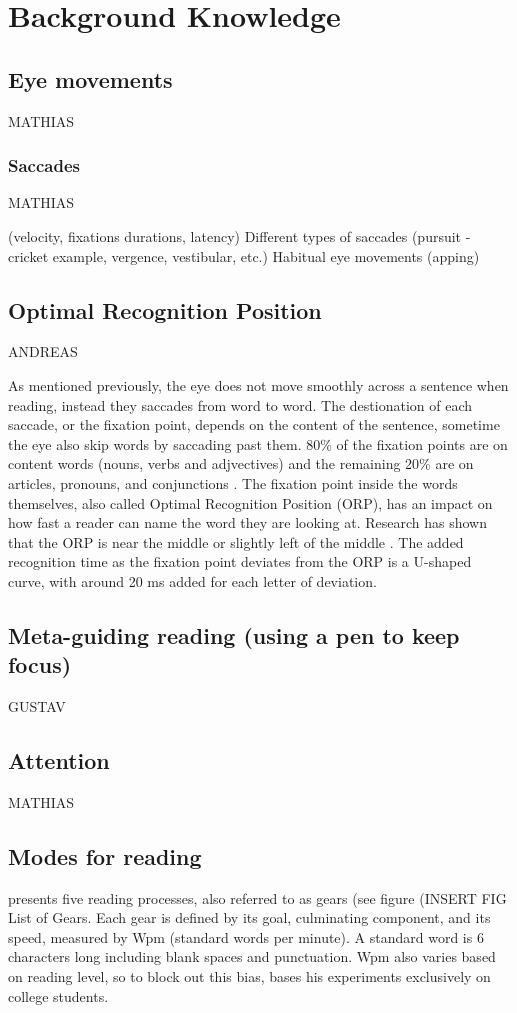 \section{Background Knowledge}

\subsection{Eye movements}
MATHIAS

\subsubsection{Saccades}
MATHIAS

(velocity, fixations durations, latency)
Different types of saccades (pursuit - cricket example, vergence, vestibular, etc.)
Habitual eye movements (apping)
\subsection{Optimal Recognition Position} \label{ORP}
ANDREAS

As mentioned previously, the eye does not move smoothly across a sentence when reading, instead they saccades from word to word. The destionation of each saccade, or the fixation point, depends on the content of the sentence, sometime the eye also skip words by saccading past them. 80\% of the fixation points are on content words (nouns, verbs and adjvectives) and the remaining 20\% are on articles, pronouns, and conjunctions \cite{eysenck_cognitive_2010}. The fixation point inside the words themselves, also called Optimal Recognition Position (ORP), has an impact on how fast a reader can name the word they are looking at. Research has shown that the ORP is near the middle or slightly left of the middle \cite{oregan_optimal_1992, nazir_letter_1998, oregan_convenient_1984}. The added recognition time as the fixation point deviates from the ORP is a U-shaped curve, with around 20 ms added for each letter of deviation.


\subsection{Meta-guiding reading (using a pen to keep focus)}
GUSTAV

\subsection{Attention}
MATHIAS

\subsection{Modes for reading}
\cite{carver_reading_1992} presents five reading processes, also referred to as gears (see figure (INSERT FIG List of Gears. Each gear is defined by its goal, culminating component, and its speed, measured by Wpm (standard words per minute). A standard word is 6 characters long including blank spaces and punctuation. Wpm also varies based on reading level, so to block out this bias, \cite{carver_reading_1992} bases his experiments exclusively on college students.

